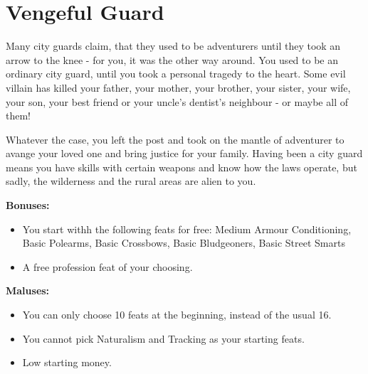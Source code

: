 \section{Vengeful Guard}
Many city guards claim, that they used to be adventurers until they took an arrow to the knee - for you, it was the other way around. You used to be an ordinary city guard, until you took a personal tragedy to the heart. Some evil villain has killed your father, your mother, your brother, your sister, your wife, your son, your best friend or your uncle's dentist's neighbour - or maybe all of them! 

Whatever the case, you left the post and took on the mantle of adventurer to avange your loved one and bring justice for your family. Having been a city guard means you have skills with certain weapons and know how the laws operate, but sadly, the wilderness and the rural areas are alien to you.


\textbf{Bonuses:}
\begin{itemize}
	\item You start withh the following feats for free: Medium Armour Conditioning, Basic Polearms, Basic Crossbows, Basic Bludgeoners, Basic Street Smarts
	\item A free profession feat of your choosing.
\end{itemize}


\textbf{Maluses:}
\begin{itemize}
	\item You can only choose 10 feats at the beginning, instead of the usual 16.
	\item You cannot pick Naturalism and Tracking as your starting feats.
	\item Low starting money.
\end{itemize}
